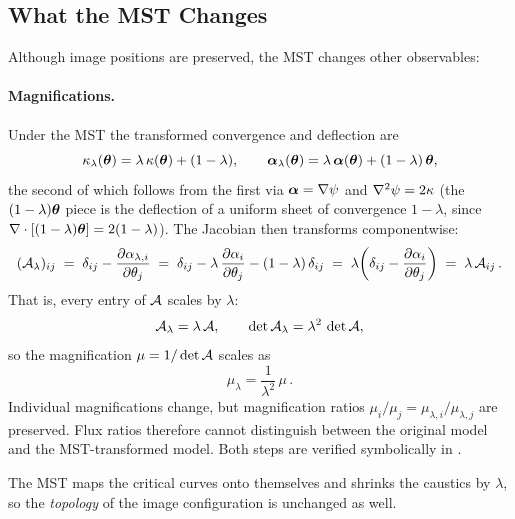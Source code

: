 \subsection{What the MST Changes}

Although image positions are preserved, the MST changes other
observables:

\paragraph{Magnifications.}
Under the MST the transformed convergence and deflection are
\begin{equation*}
    \kappa_\lambda(\boldsymbol{\theta}) = \lambda\,\kappa(\boldsymbol{\theta}) + (1-\lambda),
    \qquad
    \boldsymbol{\alpha}_\lambda(\boldsymbol{\theta}) = \lambda\,\boldsymbol{\alpha}(\boldsymbol{\theta}) + (1-\lambda)\,\boldsymbol{\theta},
\end{equation*}
the second of which follows from the first via
$\boldsymbol{\alpha} = \nabla\psi$ and $\nabla^2\psi = 2\kappa$
(the $(1-\lambda)\boldsymbol{\theta}$ piece is the deflection of a uniform
sheet of convergence $1-\lambda$, since
$\nabla\cdot[(1-\lambda)\boldsymbol{\theta}] = 2(1-\lambda)$).  The Jacobian then transforms componentwise:
\begin{equation*}
    (\mathcal{A}_\lambda)_{ij}
    \;=\; \delta_{ij} - \frac{\partial\alpha_{\lambda,i}}{\partial\theta_j}
    \;=\; \delta_{ij} - \lambda\,\frac{\partial\alpha_i}{\partial\theta_j} - (1-\lambda)\,\delta_{ij}
    \;=\; \lambda\!\left(\delta_{ij} - \frac{\partial\alpha_i}{\partial\theta_j}\right)
    \;=\; \lambda\,\mathcal{A}_{ij} \,.
\end{equation*}
That is, every entry of $\mathcal{A}$ scales by $\lambda$:
\begin{equation}
    \mathcal{A}_\lambda = \lambda\,\mathcal{A},
    \qquad
    \det \mathcal{A}_\lambda = \lambda^2\,\det\mathcal{A},
    \label{eq:mst_jacobian}
\end{equation}
so the magnification $\mu = 1/\det\mathcal{A}$ scales as
\begin{equation}
    \boxed{
    \mu_\lambda = \frac{1}{\lambda^2}\,\mu \,.}
    \label{eq:mst_magnification}
\end{equation}
Individual magnifications change, but magnification ratios
$\mu_i/\mu_j = \mu_{\lambda,i}/\mu_{\lambda,j}$ are preserved.
Flux ratios therefore cannot distinguish between the
original model and the MST-transformed model.  Both steps are
verified symbolically in
.

\begin{annotation}
The MST maps the critical curves onto themselves and shrinks the caustics by
$\lambda$, so the \emph{topology} of the image configuration is unchanged as
well.
\end{annotation}


